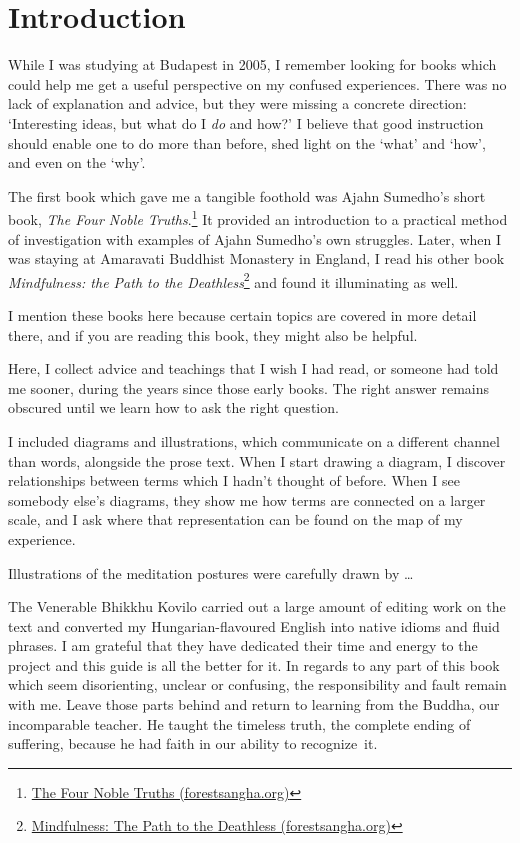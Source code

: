 \chapter{Introduction}

While I was studying at Budapest in 2005, I remember looking for books
which could help me get a useful perspective on my confused experiences.
There was no lack of explanation and advice, but they were missing a
concrete direction: `Interesting ideas, but what do I \emph{do} and
how?' I believe that good instruction should enable one to do more than
before, shed light on the `what' and `how', and even on the `why'.

The first book which gave me a tangible foothold was Ajahn Sumedho's
short book, \emph{The Four Noble Truths}.\footnote{\href{https://forestsangha.org/teachings/books/the-four-noble-truths?language=English}{The
  Four Noble Truths (forestsangha.org)}} It provided an introduction to
a practical method of investigation with examples of Ajahn Sumedho's own
struggles. Later, when I was staying at Amaravati Buddhist Monastery in
England, I read his other book \emph{Mindfulness: the Path to the
Deathless}\footnote{\href{https://forestsangha.org/teachings/books/mindfulness-the-path-to-the-deathless?language=English}{Mindfulness:
  The Path to the Deathless (forestsangha.org)}} and found it
illuminating as well.

I mention these books here because certain topics are covered in more
detail there, and if you are reading this book, they might also be
helpful.

Here, I collect advice and teachings that I wish I had read, or someone
had told me sooner, during the years since those early books. The right
answer remains obscured until we learn how to ask the right question.

I included diagrams and illustrations, which communicate on a different
channel than words, alongside the prose text. When I start drawing a
diagram, I discover relationships between terms which I hadn't thought
of before. When I see somebody else's diagrams, they show me how terms
are connected on a larger scale, and I ask where that representation can
be found on the map of my experience.

Illustrations of the meditation postures were carefully drawn by
\ldots{}

The Venerable Bhikkhu Kovilo carried out a large amount of editing work
on the text and converted my Hungarian-flavoured English into native
idioms and fluid phrases. I am grateful that they have dedicated their
time and energy to the project and this guide is all the better for it.
In regards to any part of this book which seem disorienting, unclear or
confusing, the responsibility and fault remain with me. Leave those
parts behind and return to learning from the Buddha, our incomparable
teacher. He taught the timeless truth, the complete ending of suffering,
because he had faith in our ability to recognize~it.

